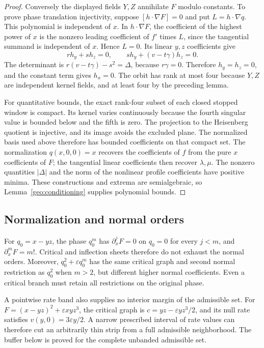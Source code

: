 \documentclass[11pt]{amsart}
\theoremstyle{definition}
\theoremstyle{remark}
\numberwithin{equation}{section}
\begin{document}
\begin{proof}
Conversely the displayed fields $Y,Z$ annihilate $F$ modulo constants. To prove phase translation injectivity, suppose $[h\cdot\nabla F]=0$ and put $L=h\cdot\nabla q$. This polynomial is independent of $x$. In $h\cdot\nabla F$, the coefficient of the highest power of $x$ is the nonzero leading coefficient of $f'$ times $L$, since the tangential summand is independent of $x$. Hence $L=0$. Its linear $y,z$ coefficients give
\[
rh_y+sh_z=0,\qquad sh_y+(v-t\gamma)h_z=0.
\]
The determinant is $r(v-t\gamma)-s^2=\Delta$, because $r\gamma=0$. Therefore $h_y=h_z=0$, and the constant term gives $h_x=0$. The orbit has rank at most four because $Y,Z$ are independent kernel fields, and at least four by the preceding lemma.

For quantitative bounds, the exact rank-four subset of each closed stopped window is compact. Its kernel varies continuously because the fourth singular value is bounded below and the fifth is zero. The projection to the Heisenberg quotient is injective, and its image avoids the excluded plane. The normalized basis used above therefore has bounded coefficients on that compact set. The normalization $q(x,0,0)=x$ recovers the coefficients of $f$ from the pure $x$ coefficients of $F$; the tangential linear coefficients then recover $\lambda,\mu$. The nonzero quantities $|\Delta|$ and the norm of the nonlinear profile coefficients have positive minima. These constructions and extrema are semialgebraic, so Lemma~\ref{geo:conditioning} supplies polynomial bounds.
\end{proof}

\subsection{Normalization and normal orders}\label{geo:normalization}\label{geo:entry-subsection}

For $q_0=x-yz$, the phase $q_0^m$ has $\partial_x^jF=0$ on $q_0=0$ for every $j<m$, and $\partial_x^mF=m!$. Critical and inflection sheets therefore do not exhaust the normal orders. Moreover, $q_0^2+\varepsilon q_0^m$ has the same critical graph and second normal restriction as $q_0^2$ when $m>2$, but different higher normal coefficients. Even a critical branch must retain all restrictions on the original phase.

A pointwise rate band also supplies no interior margin of the admissible set. For $F=(x-yz)^2+\varepsilon xyz^3$, the critical graph is $c=yz-\varepsilon yz^3/2$, and its null rate satisfies $v(y,0)=3\varepsilon y/2$. A narrow prescribed interval of rate values can therefore cut an arbitrarily thin strip from a full admissible neighborhood. The buffer below is proved for the complete unbanded admissible set.
\end{document}
